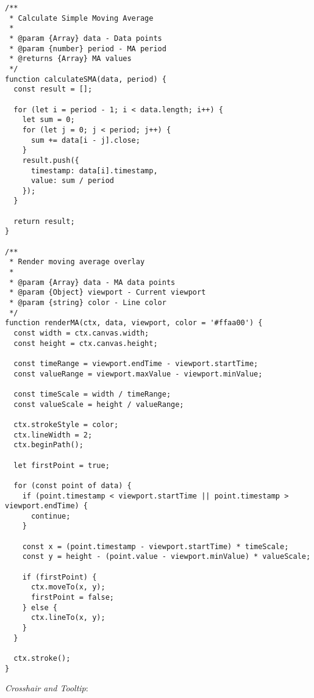 \documentclass[11pt]{article}
\begin{document}
\begin{verbatim}
/**
 * Calculate Simple Moving Average
 * 
 * @param {Array} data - Data points
 * @param {number} period - MA period
 * @returns {Array} MA values
 */
function calculateSMA(data, period) {
  const result = [];
  
  for (let i = period - 1; i < data.length; i++) {
    let sum = 0;
    for (let j = 0; j < period; j++) {
      sum += data[i - j].close;
    }
    result.push({
      timestamp: data[i].timestamp,
      value: sum / period
    });
  }
  
  return result;
}

/**
 * Render moving average overlay
 * 
 * @param {Array} data - MA data points
 * @param {Object} viewport - Current viewport
 * @param {string} color - Line color
 */
function renderMA(ctx, data, viewport, color = '#ffaa00') {
  const width = ctx.canvas.width;
  const height = ctx.canvas.height;
  
  const timeRange = viewport.endTime - viewport.startTime;
  const valueRange = viewport.maxValue - viewport.minValue;
  
  const timeScale = width / timeRange;
  const valueScale = height / valueRange;
  
  ctx.strokeStyle = color;
  ctx.lineWidth = 2;
  ctx.beginPath();
  
  let firstPoint = true;
  
  for (const point of data) {
    if (point.timestamp < viewport.startTime || point.timestamp > viewport.endTime) {
      continue;
    }
    
    const x = (point.timestamp - viewport.startTime) * timeScale;
    const y = height - (point.value - viewport.minValue) * valueScale;
    
    if (firstPoint) {
      ctx.moveTo(x, y);
      firstPoint = false;
    } else {
      ctx.lineTo(x, y);
    }
  }
  
  ctx.stroke();
}
\end{verbatim}

\emph{Crosshair and Tooltip}:
\end{document}
